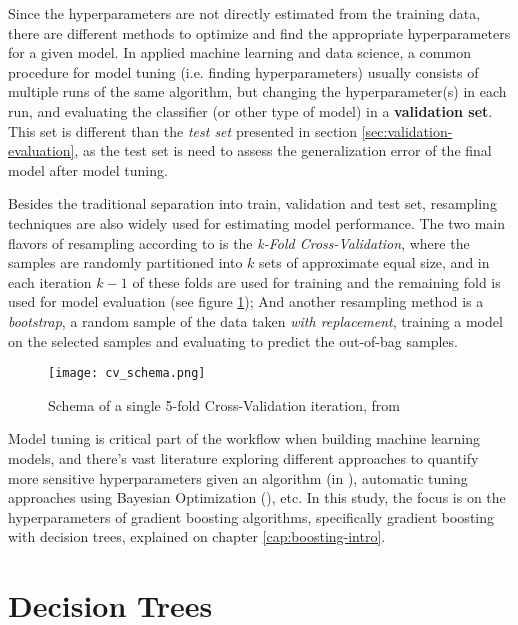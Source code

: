 Since the hyperparameters are not directly estimated from the training data, there are different methods to optimize and find the appropriate hyperparameters for a given model. In applied machine learning and data science, a common procedure for model tuning (i.e. finding hyperparameters) usually consists of multiple runs of the same algorithm, but changing the hyperparameter(s) in each run, and evaluating the classifier (or other type of model) in a \textbf{validation set}. This set is different than the \textit{test set} presented in section \ref{sec:validation-evaluation}, as the test set is need to assess the generalization error of the final model after model tuning. 

Besides the traditional separation into train, validation and test set, resampling techniques are also widely used for estimating model performance. The two main flavors of resampling according to \cite{kuhn2013applied} is the \textit{k-Fold Cross-Validation}, where the samples are randomly partitioned into $k$ sets of approximate equal size, and in each iteration $k - 1$ of these folds are used for training and the remaining fold is used for model evaluation (see figure \ref{fig:cvschema}); And another resampling method is a \textit{bootstrap}, a random sample of the data taken \textit{with replacement}, training a model on the selected samples and evaluating to predict the out-of-bag samples.

\begin{figure}[!h]
    \centering
    \texttt{[image: cv\_schema.png]} 
    \caption{Schema of a single 5-fold Cross-Validation iteration, from \cite{hastie2009elements}}
    \label{fig:cvschema}
\end{figure}

Model tuning is critical part of the workflow when building machine learning models, and there's vast literature exploring different approaches to quantify more sensitive hyperparameters given an algorithm (in \cite{probst2018tunability}), automatic tuning approaches using Bayesian Optimization (\cite{bergstra2013hyperopt}), etc. In this study, the focus is on the hyperparameters of gradient boosting algorithms, specifically gradient boosting with decision trees, explained on chapter \ref{cap:boosting-intro}.

\section{Decision Trees}

